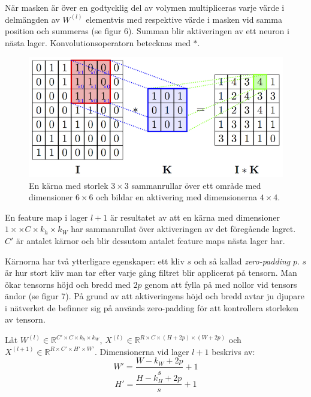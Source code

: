 \documentclass[a4paper,11pt,twoside]{article}
\begin{document}
När masken är över en godtycklig del av volymen multipliceras varje värde i delmängden av $W^{(l)}$ elementvis med respektive värde i masken vid samma position och summeras (se figur 6). Summan blir aktiveringen av ett neuron i nästa lager. Konvolutionsoperatorn betecknas med $*$. \cite{cs231n} \cite{convmath}

\begin{figure}[h]\label{figkonv}
	\centering
  		\includegraphics[scale=2.1]{convolution.png}
  	\caption{En kärna med storlek $3 \times 3$ sammanrullar över ett område med dimensioner $6 \times 6$ och bildar en aktivering med dimensionerna $4 \times 4$. \cite{figkonv}}
\end{figure}

En feature map i lager $l+1$ är resultatet av att en kärna med dimensioner $1 \times \times C  \times k_h \times k_W$ har sammanrullat över aktiveringen av det föregående lagret. $C'$ är antalet kärnor och blir dessutom antalet feature maps nästa lager har. \cite{cs231n} \cite{convmath}

Kärnorna har två ytterligare egenskaper: ett kliv $s$ och så kallad \textit{zero-padding} $p$. $s$ är hur stort kliv man tar efter varje gång filtret blir applicerat på tensorn. Man ökar tensorns höjd och bredd med $2p$ genom att fylla på med nollor vid tensors ändor (se figur 7). På grund av att aktiveringens höjd och bredd avtar ju djupare i nätverket de befinner sig på används zero-padding för att kontrollera storleken av tensorn. \cite{cs231n} \cite{convmath} \cite{convarithmetic}

Låt $W^{(l)} \in \mathbb{R}^{C' \times C  \times k_h \times k_W}$, $X^{(l)} \in \mathbb{R}^{R \times C  \times (H+2p) \times (W+2p)}$ och $X^{(l+1)} \in \mathbb{R}^{R \times C'  \times H' \times W'}$. Dimensionerna vid lager $l+1$ beskrivs av: \cite{cs231n} \cite{convmath} \cite{convarithmetic}
\begin{equation}
W' = \frac{W-k_W+2p}{s} +1
\end{equation}
\begin{equation}
H' = \frac{H-k_H+2p}{s} +1
\end{equation}
\end{document}
